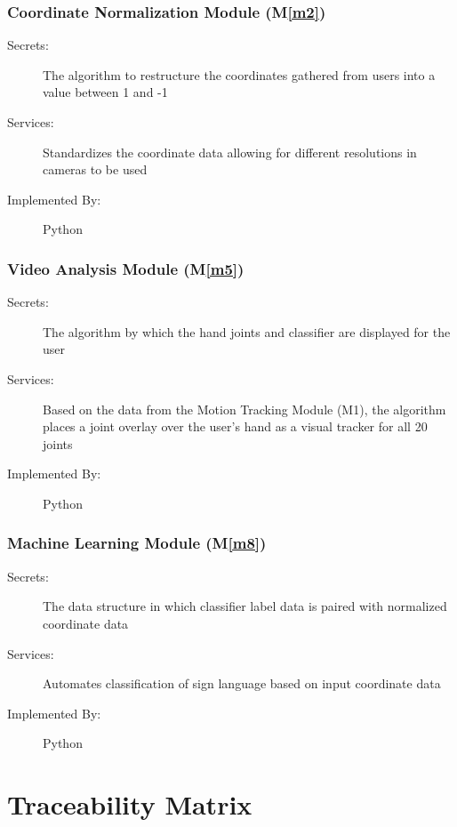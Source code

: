 \documentclass[12pt, titlepage]{article}
\newcommand{\mref}[1]{M\ref{#1}}
\begin{document}
\subsubsection{Coordinate Normalization Module (\mref{m2})}

\begin{description}
  \item[Secrets:] The algorithm to restructure the coordinates gathered from users into a value between 1 and -1
  \item[Services:] Standardizes the coordinate data allowing for different resolutions in cameras to be used
  \item[Implemented By:] Python
  \end{description}

\subsubsection{Video Analysis Module (\mref{m5})}

\begin{description}
  \item[Secrets:] The algorithm by which the hand joints and classifier are displayed for the user
  \item[Services:] Based on the data from the Motion Tracking Module (M1), the algorithm places a joint overlay over the user’s hand as a visual tracker for all 20 joints
  \item[Implemented By:] Python
  \end{description}

\subsubsection{Machine Learning Module (\mref{m8})}

\begin{description}
  \item[Secrets:] The data structure in which classifier label data is paired with normalized coordinate data
  \item[Services:] Automates classification of sign language based on input coordinate data
  \item[Implemented By:] Python
  \end{description}
  

\section{Traceability Matrix} \label{SecTM}
\end{document}
